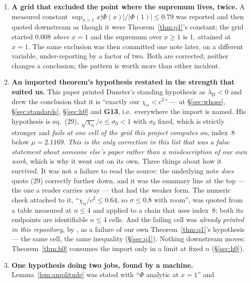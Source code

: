 \documentclass[11pt,a4paper]{article}
\theoremstyle{plain}
\theoremstyle{definition}
\theoremstyle{remark}
\newcommand{\file}[1]{\path{#1}}
\begin{document}
\begin{enumerate}
the wrong object.  \textbf{The methodological conclusion, since four for four is
not a coincidence: a post-mortem written by whoever hit a wall is evidence about
that person's attempt and not about the wall.}  Every one of the four closures
came from refusing the inherited diagnosis rather than from working on it.
\item \textbf{A grid that excluded the point where the supremum lives, twice.}
A measured constant $\sup_{x>1}x|\Phi(x)|/|\Phi(1)|\le0.79$ was reported and
then quoted downstream as though it were Theorem~\ref{thm:q1}'s constant; the
grid started $0.008$ \emph{above} $x=1$ and the supremum over $x\ge1$ is $1$,
attained at $x=1$.  The same exclusion was then committed one note later, on a
different variable, under-reporting by a factor of two.  Both are corrected;
neither changes a conclusion; the pattern is worth more than either incident.
\item \textbf{An imported theorem's hypothesis restated in the strength that
suited us.}  This paper printed Dunster's standing hypothesis as
$\lambda_{\mathrm D}<0$ and drew the conclusion that it is ``exactly our
$\chi_n<c^2$'' --- at \S\ref{sec:whose}, \S\ref{sec:standards},
\S\ref{sec:h0} and \textbf{G13}, i.e.\ everywhere the import is named.  His
hypothesis is eq.~(29), $\sqrt{\chi_n}/c\le\sigma_0<1$ with $\sigma_0$ fixed,
which is strictly stronger and \emph{fails at one cell of the grid this project
computes on}, index~$8$ below $\mu=2.1169$.  \emph{This is the only correction
in this list that was a false statement about someone else's paper rather than
a misdescription of our own work}, which is why it went out on its own.  Three
things about how it survived.  It was not a failure to read the source: the
underlying note \emph{does} quote (29) correctly further down, and it was the
summary line at the top --- the one a reader carries away --- that had the
weaker form.  The numeric check attached to it, ``$\chi_n/c^2\le0.64$, so
$\sigma\le0.8$ with room'', was quoted from a table measured at $n\le4$ and
applied to a chain that uses index~$8$; both its endpoints are identifiable
$n\le4$ cells.  And the failing cell was \emph{already printed in this
repository}, by \file{verify_q1.py}, as a failure of our own
Theorem~\ref{thm:q1}'s hypothesis --- the same cell, the same inequality
(\S\ref{sec:q1}).  Nothing downstream moves: Theorem~\ref{thm:h0} consumes the
import only in a limit at fixed $n$ (\S\ref{sec:h0}).
\item \textbf{One hypothesis doing two jobs, found by a machine.}
Lemma~\ref{lem:amplitude} was stated with ``$\Phi$ analytic at $x=1$'' and

\end{enumerate}
\end{document}
